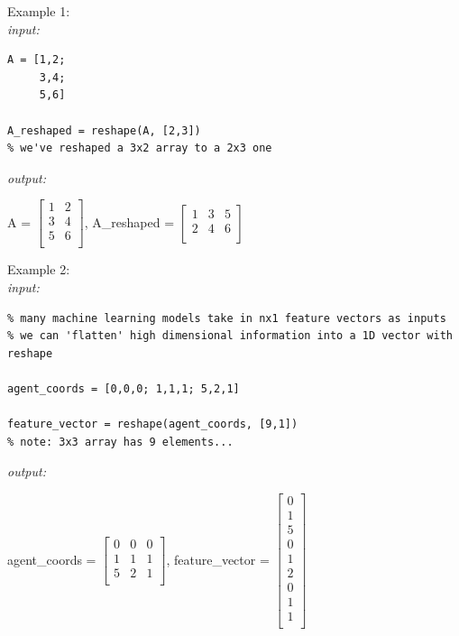 \documentclass[../MATLAB_Primer.tex]{subfiles}
\begin{document}
Example 1:\\

\textit{input:}
\begin{lstlisting}
A = [1,2;
     3,4;
     5,6]
     
A_reshaped = reshape(A, [2,3])
% we've reshaped a 3x2 array to a 2x3 one
\end{lstlisting}
\textit{output:}
\begin{center}
    A = $\begin{bmatrix}
     1 & 2\\
     3 & 4\\
     5 & 6\\
    \end{bmatrix}$,\quad
    A\_reshaped = $\begin{bmatrix}
     1 & 3 & 5\\
     2 & 4 & 6\\
    \end{bmatrix}$
\end{center}

Example 2:\\

\textit{input:}
\begin{lstlisting}
% many machine learning models take in nx1 feature vectors as inputs 
% we can 'flatten' high dimensional information into a 1D vector with reshape

agent_coords = [0,0,0; 1,1,1; 5,2,1]

feature_vector = reshape(agent_coords, [9,1])
% note: 3x3 array has 9 elements...
\end{lstlisting}
\textit{output:}
\begin{center}
    agent\_coords = $\begin{bmatrix}
     0 & 0 & 0\\
     1 & 1 & 1\\
     5 & 2 & 1\\
    \end{bmatrix}$,\quad
    feature\_vector = $\begin{bmatrix}
     0\\1\\5\\0\\1\\2\\0\\1\\1\\
    \end{bmatrix}$
\end{center}
\end{document}
